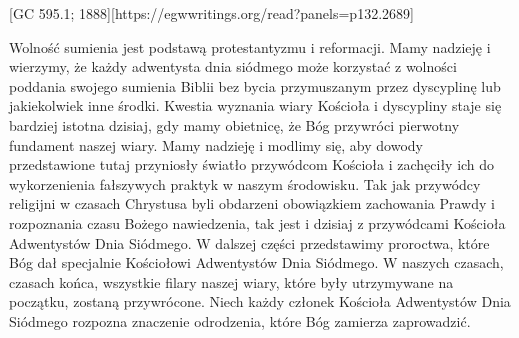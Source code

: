 [GC 595.1; 1888][https://egwwritings.org/read?panels=p132.2689]

Wolność sumienia jest podstawą protestantyzmu i reformacji. Mamy nadzieję i wierzymy, że każdy adwentysta dnia siódmego może korzystać z wolności poddania swojego sumienia Biblii bez bycia przymuszanym przez dyscyplinę lub jakiekolwiek inne środki. Kwestia wyznania wiary Kościoła i dyscypliny staje się bardziej istotna dzisiaj, gdy mamy obietnicę, że Bóg przywróci pierwotny fundament naszej wiary. Mamy nadzieję i modlimy się, aby dowody przedstawione tutaj przyniosły światło przywódcom Kościoła i zachęciły ich do wykorzenienia fałszywych praktyk w naszym środowisku. Tak jak przywódcy religijni w czasach Chrystusa byli obdarzeni obowiązkiem zachowania Prawdy i rozpoznania czasu Bożego nawiedzenia, tak jest i dzisiaj z przywódcami Kościoła Adwentystów Dnia Siódmego. W dalszej części przedstawimy proroctwa, które Bóg dał specjalnie Kościołowi Adwentystów Dnia Siódmego. W naszych czasach, czasach końca, wszystkie filary naszej wiary, które były utrzymywane na początku, zostaną przywrócone. Niech każdy członek Kościoła Adwentystów Dnia Siódmego rozpozna znaczenie odrodzenia, które Bóg zamierza zaprowadzić.

